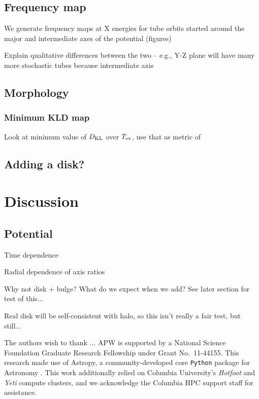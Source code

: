 \documentclass[letterpaper,12pt,preprint]{aastex}
\begin{document}
\subsection{Frequency map}

We generate frequency maps at X energies for tube orbits started around the major and intermediate axes of the potential (figures)

Explain qualitative differences between the two -- e.g., Y-Z plane will have many more stochastic tubes because intermediate axis

\subsection{Morphology}

\subsubsection{Minimum KLD map}
Look at minimum value of $D_{\rm KL}$ over $T_{\rm ev}$, use that as metric of 

\subsection{Adding a disk?}

\section{Discussion}\label{sec:discussion}

\subsection{Potential}

Time dependence

Radial dependence of axis ratios

Why not disk + bulge? What do we expect when we add? See later section for test of this...

Real disk will be self-consistent with halo, so this isn't really a fair test, but still...

\acknowledgements
The authors wish to thank ...
APW is supported by a National Science Foundation Graduate Research Fellowship under Grant No.\ 11-44155. 
This research made use of Astropy, a community-developed core \texttt{Python} package for Astronomy \citep{astropy13}.
This work additionally relied on Columbia University's \emph{Hotfoot} and \emph{Yeti} compute clusters, and we acknowledge the Columbia HPC support staff for assistance.



\end{document}
